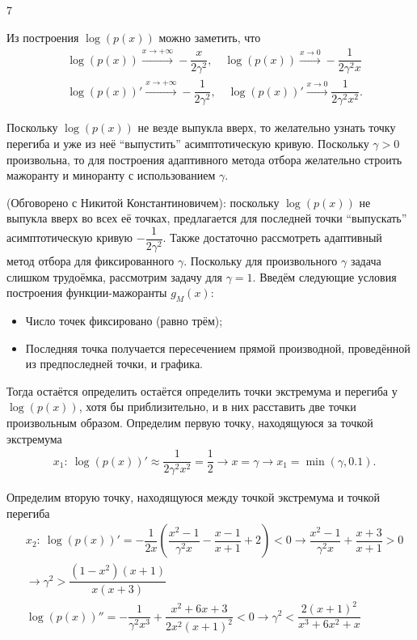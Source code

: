 7\documentclass{article}
\begin{document}
	Из построения $\log(p(x))$ можно заметить, что
	\begin{align*}
		&\log(p(x))\xrightarrow{x\rightarrow+\infty}-\dfrac{x}{2\gamma^2},\quad\log(p(x))\xrightarrow{x\rightarrow 0}-\dfrac{1}{2\gamma^2x}\\
		&		\log(p(x))'\xrightarrow{x\rightarrow+\infty}-\dfrac{1}{2\gamma^2},\quad\log(p(x))'\xrightarrow{x\rightarrow0}\dfrac{1}{2\gamma^2x^2}.
	\end{align*}	
	
	Поскольку $\log(p(x))$ не везде выпукла вверх, то желательно узнать точку перегиба и уже из неё ``выпустить'' асимптотическую кривую. Поскольку $\gamma>0$ произвольна, то для построения адаптивного метода отбора желательно строить мажоранту и миноранту с использованием $\gamma$. 
	
	(Обговорено с Никитой Константиновичем): поскольку $\log(p(x))$ не выпукла вверх во всех её точках, предлагается для последней точки ``выпускать'' асимптотическую кривую $-\dfrac{1}{2\gamma^2}$. Также достаточно рассмотреть адаптивный метод отбора для фиксированного $\gamma$. Поскольку для произвольного $\gamma$ задача слишком трудоёмка, рассмотрим задачу для $\gamma=1$. Введём следующие условия построения функции-мажоранты $g_M(x)$:
	\begin{itemize}
		\item Число точек фиксировано (равно трём);
		\item Последняя точка получается пересечением прямой производной, проведённой из предпоследней точки, и графика.
	\end{itemize}
	
	Тогда остаётся определить остаётся определить точки экстремума и перегиба у $\log(p(x))$, хотя бы приблизительно, и в них расставить две точки произвольным образом. Определим первую точку, находящуюся за точкой экстремума
	\begin{align*}
		&x_1:~\log(p(x))'\approx\dfrac{1}{2\gamma^2x^2}=\dfrac{1}{2}\rightarrow x=\gamma\rightarrow x_1=\min(\gamma, 0.1).
	\end{align*}
	
	Определим вторую точку, находящуюся между точкой экстремума и точкой перегиба
	\begin{align*}
				&x_2:~\log(p(x))'= -\dfrac{1}{2x}\left(\dfrac{x^2-1}{\gamma^2 x}-\dfrac{x-1}{x+1}+2\right)<0\rightarrow\dfrac{x^2-1}{\gamma^2 x}+\dfrac{x+3}{x+1}>0\\
				&\rightarrow\gamma^2>\dfrac{(1-x^2)(x+1)}{x(x+3)}\\
				&\log(p(x))''=-\dfrac{1}{\gamma^2x^3}+\dfrac{x^2+6x+3}{2x^2(x+1)^2}<0\rightarrow\gamma^2<\dfrac{2(x+1)^2}{x^3+6x^2+x}
	\end{align*}
\end{document}
